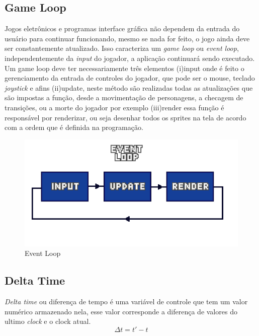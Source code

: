 \subsection{Game Loop}
\label{sec:game-loop}
Jogos eletrônicos e programas interface gráfica não dependem da entrada do usuário para continuar funcionando, mesmo se nada for feito, o jogo ainda deve ser constantemente atualizado. Isso caracteriza um \textit{game loop} ou \textit{event loop}, independentemente da \textit{input} do jogador, a aplicação continuará sendo executado.
Um game loop deve ter necessariamente três elementos (i)input onde é feito o gerenciamento da entrada de controles do jogador, que pode ser o mouse, teclado \textit{joystick} e afins (ii)update, neste método são realizadas todas as atualizações que são impostas a função, desde a movimentação de personagens, a checagem de transições, ou a morte do jogador por exemplo (iii)render essa função é responsável por renderizar, ou seja desenhar todos os sprites na tela de acordo com a ordem que é definida na programação.
\begin{figure}[h!]
    \centering
    \includegraphics[width=1\linewidth]{figuras/event-loop.png}
    \caption{Event Loop}
    \label{fig:event-loopl}
\end{figure}

\subsection{Delta Time}
\label{sec:delta-time}
 \textit{Delta time} ou diferença de tempo é uma variável de controle que tem um valor numérico armazenado nela, esse valor corresponde a diferença de valores do ultimo \textit{clock} e o clock atual.
 \begin{equation}
    \Delta t = t' - t
    \label{eq:dt_equation}
\end{equation}


